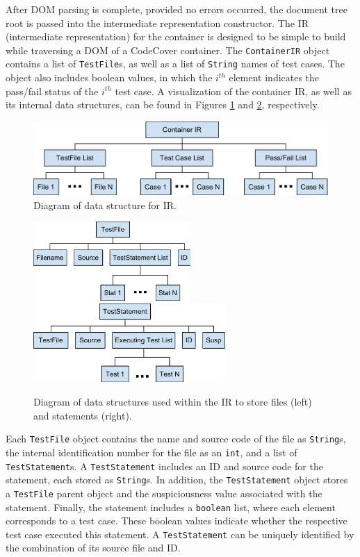 After DOM parsing is complete, provided no errors occurred, the document tree root is
passed into the intermediate representation constructor.  The IR (intermediate representation)
for the container is designed to be simple to build while traversing a DOM of a CodeCover
container.  The \texttt{ContainerIR} object contains a list of \texttt{TestFile}s, as well
as a list of \texttt{String} names of test cases.  The object also includes boolean values,
in which the $i^{th}$ element indicates the pass/fail status of the $i^{th}$ test case.  A 
visualization of the container IR, as well as its internal data structures, can be found in 
Figures \ref{fig:ir} and \ref{fig:ir2}, respectively.  

\begin{figure}[tb]
\centering
\includegraphics[width=0.8\linewidth]{img/ContainerIR.pdf}
\caption{Diagram of data structure for IR.}
\label{fig:ir}
\end{figure}

\begin{figure}[tb]
\centering
\includegraphics[height=30mm]{img/TestFile.pdf}
\hspace{0.1\linewidth}
\includegraphics[height=30mm]{img/TestStatement.pdf}
\caption{Diagram of data structures used within the IR to store files (left) and 
statements (right).}
\label{fig:ir2}
\end{figure}

Each \texttt{TestFile} object contains the name and source code of the file as \texttt{String}s, the internal identification number for the file as an \texttt{int}, and a list of \texttt{TestStatement}s.  
A \texttt{TestStatement} includes an ID and source code for the statement, each stored as \texttt{String}s.  In addition, the \texttt{TestStatement} object stores a \texttt{TestFile} 
parent object and the suspiciousness value associated with the statement.  Finally, the statement 
includes a \texttt{boolean} list, where each element corresponds to a test case.  These boolean 
values indicate whether the respective test case executed this statement.  A \texttt{TestStatement} 
can be uniquely identified by the combination of its source file and ID.

